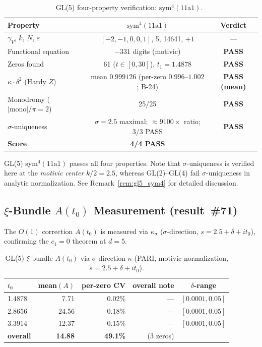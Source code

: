 \documentclass[11pt, a4paper]{article}
\theoremstyle{definition}
\theoremstyle{plain}
\begin{document}
\begin{table}[ht]
\centering
\caption{GL(5) four-property verification: $\mathrm{sym}^4(11\mathrm{a}1)$.~\label{tab:gl5_fourprop}}
\smallskip
\begin{tabular}{lcc}
\toprule
Property & $\mathrm{sym}^4(11\mathrm{a}1)$ & Verdict \\
\midrule
$\gamma_V$, $k$, $N$, $\varepsilon$ & $[-2,-1,0,0,1]$, 5, 14641, $+1$ & --- \\
Functional equation & $-331$ digits (motivic) & \textbf{PASS} \\
Zeros found & 61 ($t{\in}[0,30]$), $t_1{=}1.4878$ & \textbf{PASS} \\
$\kappa{\cdot}\delta^2$ (Hardy $Z$) & mean $0.999126$ (per-zero $0.996$--$1.002$; B-24) & \textbf{PASS (mean)} \\
Monodromy ($|\mathrm{mono}|/\pi{=}2$) & 25/25 & \textbf{PASS} \\
$\sigma$-uniqueness & $\sigma{=}2.5$ maximal; ${\approx}9100\times$ ratio; 3/3 PASS & \textbf{PASS} \\
\midrule
\textbf{Score} & \textbf{4/4 PASS} & \\
\bottomrule
\end{tabular}
\end{table}

\noindent
GL(5) sym$^4(11\mathrm{a}1)$ passes all four properties.
Note that $\sigma$-uniqueness is verified here at the \emph{motivic center} $k/2 = 2.5$,
whereas GL(2)--GL(4) fail $\sigma$-uniqueness in analytic normalization.
See Remark~\ref{rem:gl5_sym4} for detailed discussion.

\subsection{$\xi$-Bundle $A(t_0)$ Measurement (result~\#71)}
\label{subsec:gl5_xi_bundle}

The $O(1)$ correction $A(t_0)$ is measured via $\kappa_\sigma$ ($\sigma$-direction,
$s = 2.5 + \delta + it_0$), confirming the $c_1 = 0$ theorem at $d = 5$.

\begin{table}[ht]
\centering
\caption{GL(5) $\xi$-bundle $A(t_0)$ via $\sigma$-direction $\kappa$
(PARI, motivic normalization, $s = 2.5 + \delta + it_0$).
\label{tab:gl5_xi_bundle}}
\smallskip
\begin{tabular}{lrrrc}
\toprule
$t_0$ & mean$(A)$ & per-zero CV & overall note & $\delta$-range \\
\midrule
1.4878 & 7.71 & 0.02\% & --- & $[0.0001, 0.05]$ \\
2.8656 & 24.56 & 0.18\% & --- & $[0.0001, 0.05]$ \\
3.3914 & 12.37 & 0.15\% & --- & $[0.0001, 0.05]$ \\
\midrule
\textbf{overall} & \textbf{14.88} & \textbf{49.1\%} & \small (3 zeros) & \\
\bottomrule
\end{tabular}
\end{table}
\end{document}
